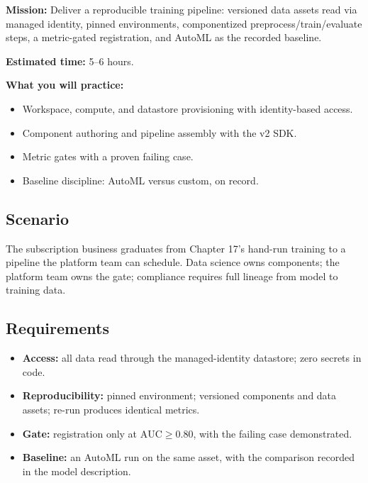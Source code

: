 \begin{capstonebox}
\textbf{Mission:} Deliver a reproducible training pipeline: versioned data assets read via managed identity, pinned environments, componentized preprocess/train/evaluate steps, a metric-gated registration, and AutoML as the recorded baseline.

\textbf{Estimated time:} 5--6 hours.

\textbf{What you will practice:}
\begin{itemize}
    \item Workspace, compute, and datastore provisioning with identity-based access.
    \item Component authoring and pipeline assembly with the v2 SDK.
    \item Metric gates with a proven failing case.
    \item Baseline discipline: AutoML versus custom, on record.
\end{itemize}
\end{capstonebox}

\subsection*{Scenario}
The subscription business graduates from Chapter 17's hand-run training to a pipeline the platform team can schedule. Data science owns components; the platform team owns the gate; compliance requires full lineage from model to training data.

\subsection*{Requirements}
\begin{itemize}
    \item \textbf{Access:} all data read through the managed-identity datastore; zero secrets in code.
    \item \textbf{Reproducibility:} pinned environment; versioned components and data assets; re-run produces identical metrics.
    \item \textbf{Gate:} registration only at $\text{AUC} \ge 0.80$, with the failing case demonstrated.
    \item \textbf{Baseline:} an AutoML run on the same asset, with the comparison recorded in the model description.
\end{itemize}

